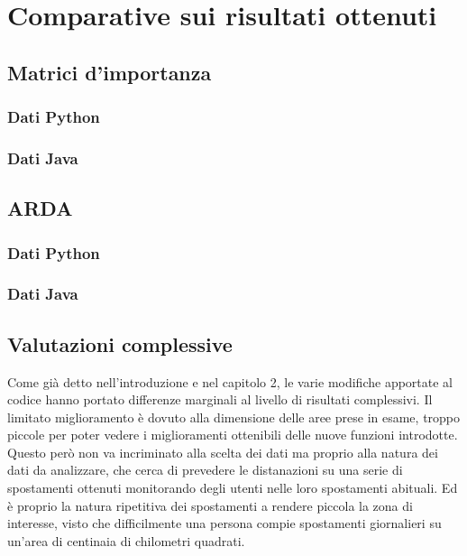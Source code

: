 \chapter{Comparative sui risultati ottenuti}

\section{Matrici d'importanza}
\subsection{Dati Python}
\subsection{Dati Java}

\section{ARDA}
\subsection{Dati Python}
\subsection{Dati Java}

\section{Valutazioni complessive}
Come gi\`a detto nell'introduzione e nel capitolo 2, le varie modifiche apportate
al codice hanno portato differenze marginali al livello di risultati complessivi.
Il limitato miglioramento \`e dovuto alla dimensione delle aree prese in esame, troppo
piccole per poter vedere i miglioramenti ottenibili delle nuove funzioni introdotte.\\
Questo per\`o non va incriminato alla scelta dei dati ma proprio alla natura dei
dati da analizzare, che cerca di prevedere le distanazioni su una serie di spostamenti
ottenuti monitorando degli utenti nelle loro spostamenti abituali. Ed \`e proprio la
natura ripetitiva dei spostamenti a rendere piccola la zona di interesse, visto che
difficilmente una persona compie spostamenti giornalieri su un'area di centinaia di
chilometri quadrati.
